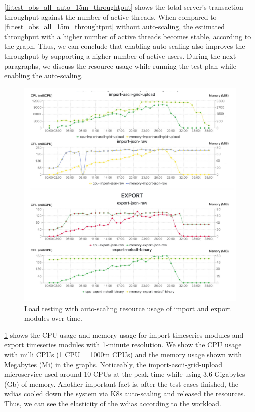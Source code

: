 \cref{fi:test_obs_all_auto_15m_throughtput} shows the total server's transaction throughput against the number of active threads. When compared to \cref{fi:test_obs_all_15m_throughtput} without auto-scaling, the estimated throughput with a higher number of active threads becomes stable, according to the graph. Thus, we can conclude that enabling auto-scaling also improves the throughput by supporting a higher number of active users. During the next paragraphs, we discuss the resource usage while running the test plan while enabling the auto-scaling.

\begin{figure}[htp]
    \centering
    \includegraphics[width=1.0\textwidth]{results/obs/all_auto/obs_all_auto_15m_import_export_res.pdf}
    \caption{Load testing with auto-scaling resource usage of import and export modules over time.}
    \label{fi:obs_all_auto_15m_import_export_res}
\end{figure}

\cref{fi:obs_all_auto_15m_import_export_res} shows the CPU usage and memory usage for import timeseries modules and export timeseries modules with 1-minute resolution. We show the CPU usage with milli CPUs \cite{LinuxFoundationKubernetes:Containers} (1 CPU = 1000m CPUs) and the memory usage shown with Megabytes (Mi) \cite{LinuxFoundationKubernetes:Containers} in the graphs. Noticeably, the import-ascii-grid-upload microservice used around 10 CPUs at the peak time while using 3.6 Gigabytes (Gb) of memory. Another important fact is, after the test cases finished, the \acrshort{wdias} cooled down the system via K8s auto-scaling and released the resources. Thus, we can see the elasticity of the \acrshort{wdias} according to the workload.


